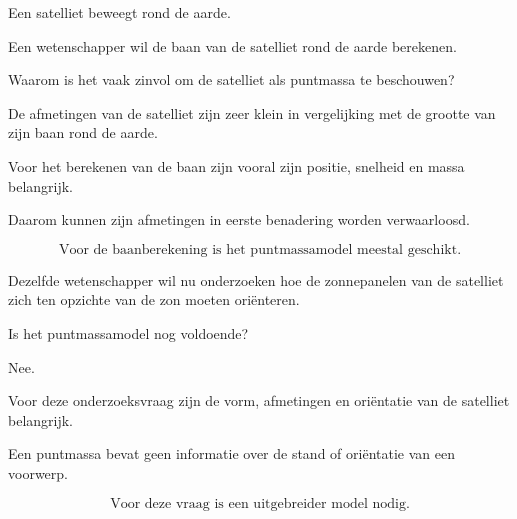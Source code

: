 \documentclass{ximera}
\begin{document}
  
  
  \begin{oefening}{\oefU}
  
  Een satelliet beweegt rond de aarde.
  
  \begin{question}
  Een wetenschapper wil de baan van de satelliet rond de aarde berekenen.
  
  Waarom is het vaak zinvol om de satelliet als puntmassa te beschouwen?
  
  \begin{oplossing}
  De afmetingen van de satelliet zijn zeer klein in vergelijking met de grootte
  van zijn baan rond de aarde.
  
  Voor het berekenen van de baan zijn vooral zijn positie, snelheid en massa
  belangrijk.
  
  Daarom kunnen zijn afmetingen in eerste benadering worden verwaarloosd.
  
  \[
  \boxed{\text{Voor de baanberekening is het puntmassamodel meestal geschikt.}}
  \]
  \end{oplossing}
  \end{question}
  
  
  \begin{question}
  Dezelfde wetenschapper wil nu onderzoeken hoe de zonnepanelen van de
  satelliet zich ten opzichte van de zon moeten oriënteren.
  
  Is het puntmassamodel nog voldoende?
  
  \begin{oplossing}
  Nee.
  
  Voor deze onderzoeksvraag zijn de vorm, afmetingen en oriëntatie van de
  satelliet belangrijk.
  
  Een puntmassa bevat geen informatie over de stand of oriëntatie van een
  voorwerp.
  
  \[
  \boxed{\text{Voor deze vraag is een uitgebreider model nodig.}}
  \]
  \end{oplossing}
  \end{question}
  
  \end{oefening}
  
  
  
\end{document}
